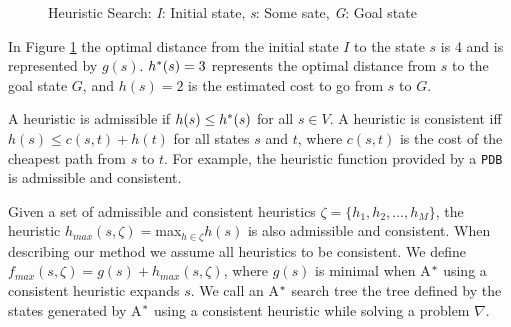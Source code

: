 \begin{figure}[htb]
\centering
{}
\caption{Heuristic Search: \textit{I}: Initial state, \textit{s}: Some sate, \textit{G}: Goal state} \label{fig:searchSpace}
\end{figure}

In Figure \ref{fig:searchSpace} the optimal distance from the initial state $I$ to  the state $s$ is 4 and is represented by $g(s)$. $h\sp{*}(s) = 3$ represents the optimal distance from $s$ to the goal state $G$, and $h(s) = 2$ is the estimated cost to go from $s$ to $G$.

A heuristic is admissible if $h(s) \leq h\sp{*}(s)$ for all $s \in V$. %
A heuristic is consistent iff $h(s) \leq c(s,t) + h(t)$ for all states $s$ and $t$, where $c(s,t)$ is the cost of the cheapest path from $s$ to $t$. For example, the heuristic function provided by a \texttt{PDB} \cite{culberson1998pattern} is admissible and consistent.

Given a set of admissible and consistent heuristics $\zeta = \{h_{1}, h_{2}, \dots, h_{M}\}$, the heuristic $h_{max}(s,\zeta) = $max$_{h \in \zeta} h(s)$ is also admissible and consistent. When describing our method we assume all heuristics to be consistent. We define $f_{max}(s, \zeta) = g(s) + h_{max}(s, \zeta)$, where $g(s)$ is minimal when A$\sp{*}$ using a consistent heuristic expands $s$. We call an A$\sp{*}$ search tree the tree defined by the states generated by A$\sp{*}$ using a consistent heuristic while solving a problem $\nabla$.

